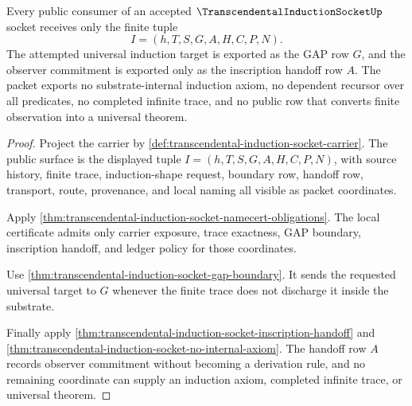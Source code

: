 \begin{theorem}
\label{thm:transcendental-induction-socket-public-export}
Every public consumer of an accepted $\TranscendentalInductionSocketUp$ socket receives only the finite tuple
$$
I=(h,T,S,G,A,H,C,P,N).
$$
The attempted universal induction target is exported as the GAP row $G$, and the observer commitment is exported only as the inscription handoff row $A$. The packet exports no substrate-internal induction axiom, no dependent recursor over all predicates, no completed infinite trace, and no public row that converts finite observation into a universal theorem.
\end{theorem}
\begin{proof}
Project the carrier by \autoref{def:transcendental-induction-socket-carrier}. The public surface is the displayed tuple $I=(h,T,S,G,A,H,C,P,N)$, with source history, finite trace, induction-shape request, boundary row, handoff row, transport, route, provenance, and local naming all visible as packet coordinates.

Apply \autoref{thm:transcendental-induction-socket-namecert-obligations}. The local certificate admits only carrier exposure, trace exactness, GAP boundary, inscription handoff, and ledger policy for those coordinates.

Use \autoref{thm:transcendental-induction-socket-gap-boundary}. It sends the requested universal target to $G$ whenever the finite trace does not discharge it inside the substrate.

Finally apply \autoref{thm:transcendental-induction-socket-inscription-handoff} and \autoref{thm:transcendental-induction-socket-no-internal-axiom}. The handoff row $A$ records observer commitment without becoming a derivation rule, and no remaining coordinate can supply an induction axiom, completed infinite trace, or universal theorem.
\end{proof}

